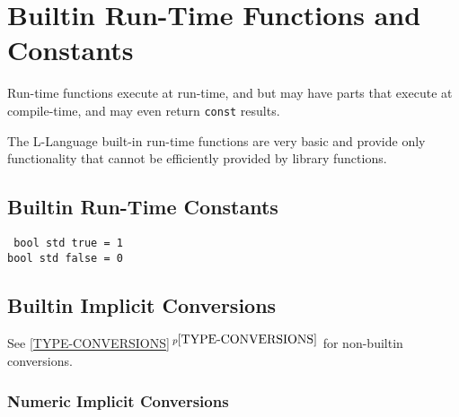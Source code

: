 \documentclass[12pt]{article}
\newcommand{\itemref}[1]{\ref{#1}$\,^{p\pageref{#1}}$}
\newenvironment{indpar}[1][0.3in]%
	{\begin{list}{}%
		     {\setlength{\itemsep}{0in}%
		      \setlength{\topsep}{0in}%
		      \setlength{\parsep}{1ex}%
		      \setlength{\labelwidth}{#1}%
		      \setlength{\leftmargin}{#1}%
		      \addtolength{\leftmargin}{\labelsep}}%
	 \item}%
	{\end{list}}
\begin{document}
\section{Builtin Run-Time Functions and Constants}

Run-time functions execute at run-time, and but may have
parts that execute at compile-time, and may even return
{\tt const} results.

The L-Language built-in run-time functions are very basic
and provide only functionality that cannot be efficiently
provided by library functions.

\subsection{Builtin Run-Time Constants}
\label{BUILTIN-RUN-TIME-CONSTANTS}

\begin{indpar} \tt
bool std true = 1 \\
bool std false = 0
\end{indpar}


\subsection{Builtin Implicit Conversions}
\label{BUILTIN-IMPLICIT-CONVERSIONS}

See \itemref{TYPE-CONVERSIONS} for non-builtin conversions.


\subsubsection{Numeric Implicit Conversions}
\label{NUMERIC-IMPLICIT-CONVERSIONS}
\end{document}
